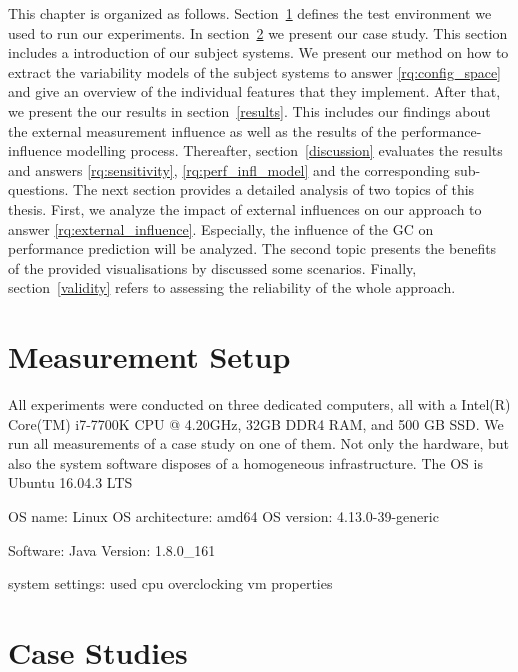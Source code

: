 This chapter is organized as follows. Section~\ref{test_env} defines the test environment we used to run our experiments. In section~\ref{case_studies} we present our case study. This section includes a introduction of our subject systems. We present our method on how to extract the variability models of the subject systems to answer \ref{rq:config_space} and give an overview of the individual features that they implement. After that, we present the our results in section~\ref{results}. This includes our findings about the external measurement influence as well as the results of the performance-influence modelling process. Thereafter, section~\ref{discussion} evaluates the results and answers \ref{rq:sensitivity}, \ref{rq:perf_infl_model} and the corresponding sub-questions. The next section provides a detailed analysis of two topics of this thesis. First, we analyze the impact of external influences on our approach to answer \ref{rq:external_influence}. Especially, the influence of the \ac{GC} on performance prediction will be analyzed. The second topic presents the benefits of the provided visualisations by discussed some scenarios. Finally, section~\ref{validity} refers to assessing the reliability of the whole approach. 


\section{Measurement Setup}
\label{test_env}

All experiments were conducted on three dedicated computers, all with a Intel(R) Core(TM) i7-7700K CPU @ 4.20GHz, 32GB DDR4 RAM, and 500 GB SSD. We run all measurements of a case study on one of them. Not only the hardware, but also the system software disposes of a homogeneous infrastructure. The \ac{OS} is Ubuntu 16.04.3 LTS





OS name:         Linux
OS architecture: amd64
OS version:      4.13.0-39-generic

Software:
Java Version:    1.8.0\_161

system settings:
used cpu
overclocking
vm properties




\section{Case Studies}
\label{case_studies}

